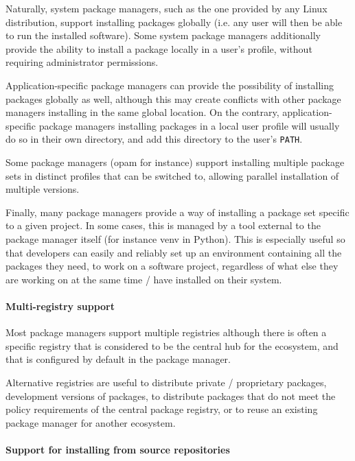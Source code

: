 Naturally, system package managers, such as the one provided by any Linux distribution, support installing packages globally (i.e. any user will then be able to run the installed software).
Some system package managers additionally provide the ability to install a package locally in a user's profile, without requiring administrator permissions.

Application-specific package managers can provide the possibility of installing packages globally as well, although this may create conflicts with other package managers installing in the same global location.
On the contrary, application-specific package managers installing packages in a local user profile will usually do so in their own directory, and add this directory to the user's \verb|PATH|.

Some package managers (opam for instance) support installing multiple package sets in distinct profiles that can be switched to, allowing parallel installation of multiple versions.

Finally, many package managers provide a way of installing a package set specific to a given project.
In some cases, this is managed by a tool external to the package manager itself (for instance venv in Python).
This is especially useful so that developers can easily and reliably set up an environment containing all the packages they need, to work on a software project, regardless of what else they are working on at the same time / have installed on their system.

\paragraph{Multi-registry support}

Most package managers support multiple registries although there is often a specific registry that is considered to be the central hub for the ecosystem, and that is configured by default in the package manager.

Alternative registries are useful to distribute private / proprietary packages, development versions of packages, to distribute packages that do not meet the policy requirements of the central package registry, or to reuse an existing package manager for another ecosystem.

\paragraph{Support for installing from source repositories}

